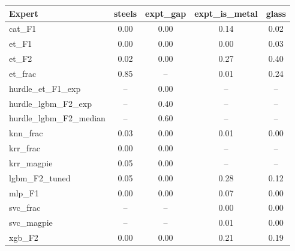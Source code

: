 \begin{tabular}{lcccc}
\toprule
Expert & steels & expt\_gap & expt\_is\_metal & glass \\
\midrule
cat\_F1 & 0.00 & 0.00 & 0.14 & 0.02 \\
et\_F1 & 0.00 & 0.00 & 0.00 & 0.03 \\
et\_F2 & 0.02 & 0.00 & 0.27 & 0.40 \\
et\_frac & 0.85 & -- & 0.01 & 0.24 \\
hurdle\_et\_F1\_exp & -- & 0.00 & -- & -- \\
hurdle\_lgbm\_F2\_exp & -- & 0.40 & -- & -- \\
hurdle\_lgbm\_F2\_median & -- & 0.60 & -- & -- \\
knn\_frac & 0.03 & 0.00 & 0.01 & 0.00 \\
krr\_frac & 0.00 & 0.00 & -- & -- \\
krr\_magpie & 0.05 & 0.00 & -- & -- \\
lgbm\_F2\_tuned & 0.05 & 0.00 & 0.28 & 0.12 \\
mlp\_F1 & 0.00 & 0.00 & 0.07 & 0.00 \\
svc\_frac & -- & -- & 0.00 & 0.00 \\
svc\_magpie & -- & -- & 0.01 & 0.00 \\
xgb\_F2 & 0.00 & 0.00 & 0.21 & 0.19 \\
\bottomrule
\end{tabular}
